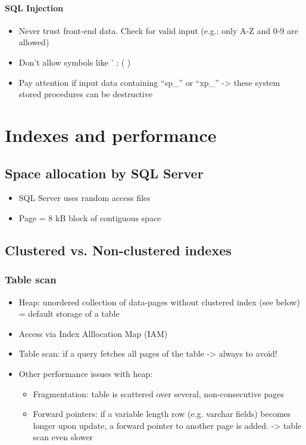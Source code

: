 \documentclass{report}
\begin{document}
    \subsubsection{SQL Injection}
        \begin{itemize} 
            \item Never trust front-end data. Check for valid input (e.g.: only A-Z and 0-9 are allowed)
            \item Don't allow symbols like ' ; ( ) \textendash
            \item Pay attention if input data containing ``sp\_'' or ``xp\_'' -> these system stored procedures can be destructive
        \end{itemize}
    
{\let\clearpage\relax \chapter{Indexes and performance}}

    \section{Space allocation by SQL Server}
    \begin{itemize} 
        \item SQL Server uses random access files
        \item Page = 8 kB block of contiguous space
    \end{itemize}
    \section{Clustered vs. Non-clustered indexes}
    \subsection{Table scan}
    \begin{itemize} 
        \item Heap: unordered collection of data-pages without clustered index (see below) = default storage of a table
        \item Access via Index Alllocation Map (IAM)
        \item Table scan: if a query fetches all pages of the table -> always to avoid!
        \item Other performance issues with heap:
            \begin{itemize} 
                \item Fragmentation: table is scattered over several, non-consecutive pages
                \item Forward pointers: if a variable length row (e.g. varchar fields) becomes longer upon update, a forward pointer to another page is added. -> table scan even slower
            \end{itemize}
    \end{itemize}
\end{document}
